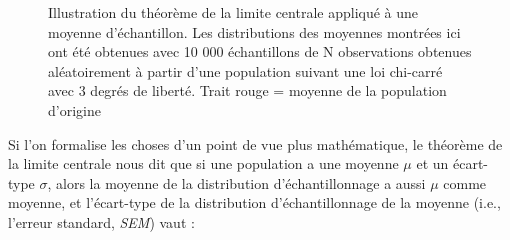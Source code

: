 \documentclass[
  letterpaper,
]{book}
\begin{document}
\begin{figure}


\caption{\label{fig-CentralLimTheo2}Illustration du théorème de la
limite centrale appliqué à une moyenne d'échantillon. Les distributions
des moyennes montrées ici ont été obtenues avec 10 000 échantillons de N
observations obtenues aléatoirement à partir d'une population suivant
une loi chi-carré avec 3 degrés de liberté. Trait rouge = moyenne de la
population d'origine}

\end{figure}%

Si l'on formalise les choses d'un point de vue plus mathématique, le
théorème de la limite centrale nous dit que si une population a une
moyenne \(\mu\) et un écart-type \(\sigma\), alors la moyenne de la
distribution d'échantillonnage a aussi \(\mu\) comme moyenne, et
l'écart-type de la distribution d'échantillonnage de la moyenne (i.e.,
l'erreur standard, \emph{SEM}) vaut :
\end{document}
